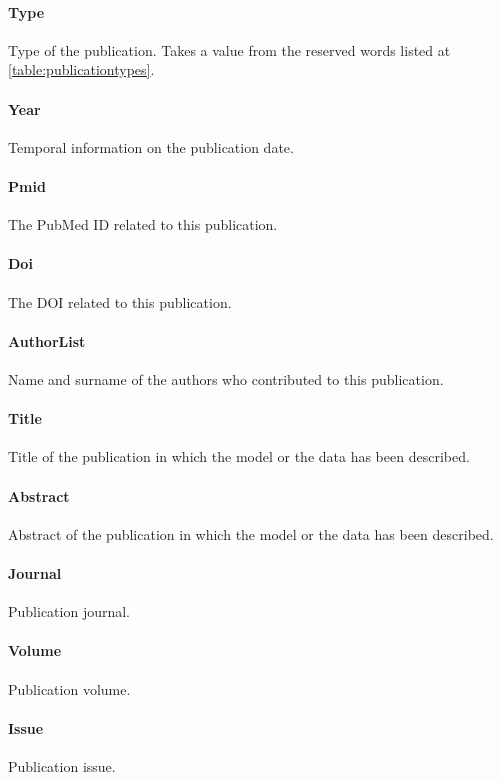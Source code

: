 \documentclass[a4paper]{report}
\begin{document}
\paragraph{Type}
Type of the publication. Takes a value from the reserved words listed at \ref{table:publicationtypes}.

\paragraph{Year}
Temporal information on the publication date.

\paragraph{Pmid}
The PubMed ID related to this publication.

\paragraph{Doi}
The DOI related to this publication.

\paragraph{AuthorList}
Name and surname of the authors who contributed to this publication.

\paragraph{Title}
Title of the publication in which the model or the data has been described.

\paragraph{Abstract}
Abstract of the publication in which the model or the data has been described.

\paragraph{Journal}
Publication journal.

\paragraph{Volume}
Publication volume.

\paragraph{Issue}
Publication issue.
\end{document}
